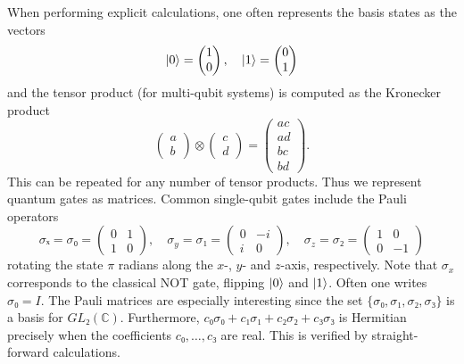 When performing explicit calculations, one often represents the basis states as the vectors
\begin{equation}
  \lvert0\rangle = \begin{pmatrix} 1 \\ 0\end{pmatrix}, \quad \lvert1\rangle = \begin{pmatrix} 0 \\ 1 \end{pmatrix}
\end{equation}
and the tensor product (for multi-qubit systems) is computed as the Kronecker product
\begin{equation}
  \begin{pmatrix} a \\ b \end{pmatrix} \otimes \begin{pmatrix} c \\ d \end{pmatrix}
  = \begin{pmatrix} ac \\ ad \\ bc \\ bd \end{pmatrix}.
\end{equation}
This can be repeated for any number of tensor products. Thus we represent quantum gates as matrices. Common single-qubit gates include the Pauli operators
\begin{equation}
  σₓ  = σ₀ = \begin{pmatrix} 0 & 1 \\ 1 & 0 \end{pmatrix}, \quad
  σ_y = σ₁ = \begin{pmatrix} 0 & -i \\ i & 0 \end{pmatrix}, \quad
  σ_z = σ₂ = \begin{pmatrix} 1 & 0 \\ 0 & -1 \end{pmatrix}
\end{equation}
rotating the state $\pi$ radians along the $x$-, $y$- and $z$-axis, respectively. Note that $\sigma_x$ corresponds to the classical NOT gate, flipping $\lvert0\rangle$ and $\lvert1\rangle$. Often one writes $σ₀ = I$. The Pauli matrices are especially interesting since the set $\{σ₀,σ₁,σ₂,σ₃\}$ is a basis for $GL₂(ℂ)$. Furthermore, $c₀σ₀ + c₁σ₁ + c₂σ₂ + c₃σ₃$ is Hermitian precisely when the coefficients $c₀,…,c₃$ are real. This is verified by straight-forward calculations.

